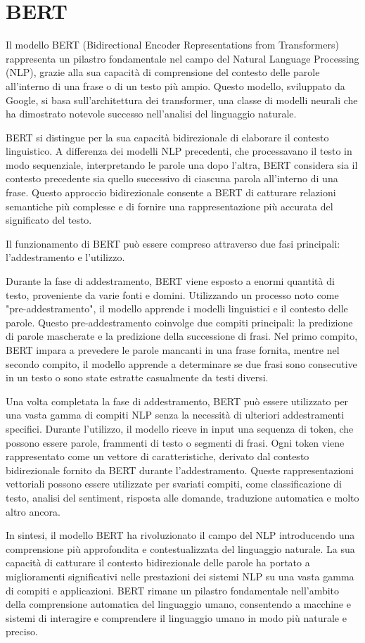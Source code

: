 \documentclass[12pt,a4paper]{report}
\begin{document}
\section{BERT}
Il modello BERT (Bidirectional Encoder Representations from Transformers) rappresenta un pilastro fondamentale nel campo del Natural Language Processing (NLP), grazie alla sua capacità di comprensione del contesto delle parole all'interno di una frase o di un testo più ampio. Questo modello, sviluppato da Google, si basa sull'architettura dei transformer, una classe di modelli neurali che ha dimostrato notevole successo nell'analisi del linguaggio naturale.

BERT si distingue per la sua capacità bidirezionale di elaborare il contesto linguistico. A differenza dei modelli NLP precedenti, che processavano il testo in modo sequenziale, interpretando le parole una dopo l'altra, BERT considera sia il contesto precedente sia quello successivo di ciascuna parola all'interno di una frase. Questo approccio bidirezionale consente a BERT di catturare relazioni semantiche più complesse e di fornire una rappresentazione più accurata del significato del testo.

Il funzionamento di BERT può essere compreso attraverso due fasi principali: l'addestramento e l'utilizzo.

Durante la fase di addestramento, BERT viene esposto a enormi quantità di testo, proveniente da varie fonti e domini. Utilizzando un processo noto come "pre-addestramento", il modello apprende i modelli linguistici e il contesto delle parole. Questo pre-addestramento coinvolge due compiti principali: la predizione di parole mascherate e la predizione della successione di frasi. Nel primo compito, BERT impara a prevedere le parole mancanti in una frase fornita, mentre nel secondo compito, il modello apprende a determinare se due frasi sono consecutive in un testo o sono state estratte casualmente da testi diversi.

Una volta completata la fase di addestramento, BERT può essere utilizzato per una vasta gamma di compiti NLP senza la necessità di ulteriori addestramenti specifici. Durante l'utilizzo, il modello riceve in input una sequenza di token, che possono essere parole, frammenti di testo o segmenti di frasi. Ogni token viene rappresentato come un vettore di caratteristiche, derivato dal contesto bidirezionale fornito da BERT durante l'addestramento. Queste rappresentazioni vettoriali possono essere utilizzate per svariati compiti, come classificazione di testo, analisi del sentiment, risposta alle domande, traduzione automatica e molto altro ancora.

In sintesi, il modello BERT ha rivoluzionato il campo del NLP introducendo una comprensione più approfondita e contestualizzata del linguaggio naturale. La sua capacità di catturare il contesto bidirezionale delle parole ha portato a miglioramenti significativi nelle prestazioni dei sistemi NLP su una vasta gamma di compiti e applicazioni. BERT rimane un pilastro fondamentale nell'ambito della comprensione automatica del linguaggio umano, consentendo a macchine e sistemi di interagire e comprendere il linguaggio umano in modo più naturale e preciso.


\nocite{*}
\end{document}
